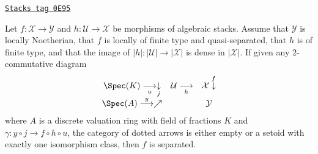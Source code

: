 \begin{lemma}
\label{stacks-more-morphisms-lemma-refined-valuative-criterion-separated}
\href{https://stacks.math.columbia.edu/tag/0E95}{\texttt{Stacks tag 0E95}}

Let $f : \mathcal{X} \to \mathcal{Y}$ and $h : \mathcal{U} \to \mathcal{X}$
be morphisms of algebraic stacks. Assume that $\mathcal{Y}$ is
locally Noetherian, that $f$ is locally of finite type and quasi-separated,
that $h$ is of finite type, and that the image of
$|h| : |\mathcal{U}| \to |\mathcal{X}|$ is dense in $|\mathcal{X}|$.
If given any $2$-commutative diagram
$$
\begin{array}{ccc}\Spec(K) \underset{u}{\longrightarrow}\underset{j}{\downarrow} & \mathcal{U} \underset{h}{\longrightarrow} & \mathcal{X} \overset{f}{\downarrow} \\ \Spec(A) \overset{y}{\longrightarrow}\nearrow &  & \mathcal{Y}\end{array}
$$
where $A$ is a discrete valuation ring with field of fractions $K$
and $\gamma : y \circ j \to f \circ h \circ u$, the category
of dotted arrows is either empty or a setoid with exactly
one isomorphism class, then $f$ is separated.
\end{lemma}

